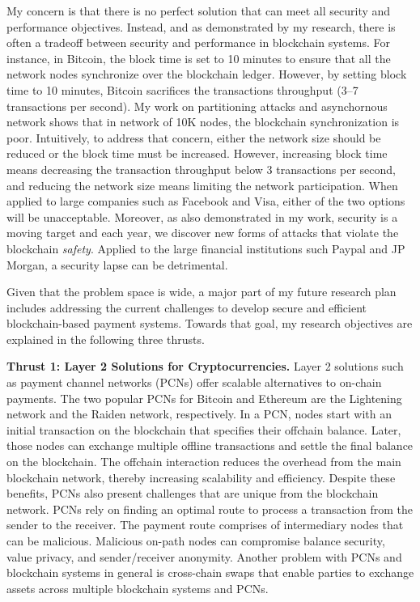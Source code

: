 \documentclass{NSF}
\newcommand{\BfPara}[1]{{\noindent\textbf{#1.}}\xspace}
\begin{document}
My concern is that there is no perfect solution that can meet all security and performance objectives. Instead, and as demonstrated by my research, there is often a tradeoff between security and performance in blockchain systems. For instance, in Bitcoin, the block time is set to 10 minutes to ensure that all the network nodes synchronize over the blockchain ledger. However, by setting block time to 10 minutes, Bitcoin sacrifices the transactions throughput (3--7 transactions per second). My work on partitioning attacks and asynchornous network shows that in network of 10K nodes, the blockchain synchronization is poor. Intuitively, to address that concern, either the network size should be reduced or the block time must be increased. However, increasing block time means decreasing the transaction throughput below 3 transactions per second, and reducing the network size means limiting the network participation. When applied to large companies such as Facebook and Visa, either of the two options will be unacceptable. Moreover, as also demonstrated in my work, security is a moving target and each year, we discover new forms of attacks that violate the blockchain {\em safety}. Applied to the large financial institutions such Paypal and JP Morgan, a security lapse can be detrimental. 


Given that the problem space is wide, a major part of my future research plan includes addressing the current challenges to develop secure and efficient blockchain-based payment systems. Towards that goal, my research objectives are explained in the following three thrusts. 

\BfPara{Thrust 1: Layer 2 Solutions for Cryptocurrencies} Layer 2 solutions such as payment channel networks (PCNs) offer scalable alternatives to on-chain payments. The two popular PCNs for Bitcoin and Ethereum are the Lightening network and the Raiden network, respectively. In a PCN, nodes start with an initial transaction on the blockchain that specifies their offchain balance. Later, those nodes can exchange multiple offline transactions and settle the final balance on the blockchain. The offchain interaction reduces the overhead from the main blockchain network, thereby increasing scalability and efficiency. Despite these benefits, PCNs also present challenges that are unique from the blockchain network. PCNs rely on finding an optimal route to process a transaction from the sender to the receiver. The payment route comprises of intermediary nodes that can be malicious. Malicious on-path nodes can compromise balance security, value privacy, and sender/receiver anonymity. Another problem with PCNs and blockchain systems in general is cross-chain swaps that enable parties to exchange assets across multiple blockchain systems and PCNs. 
\end{document}
